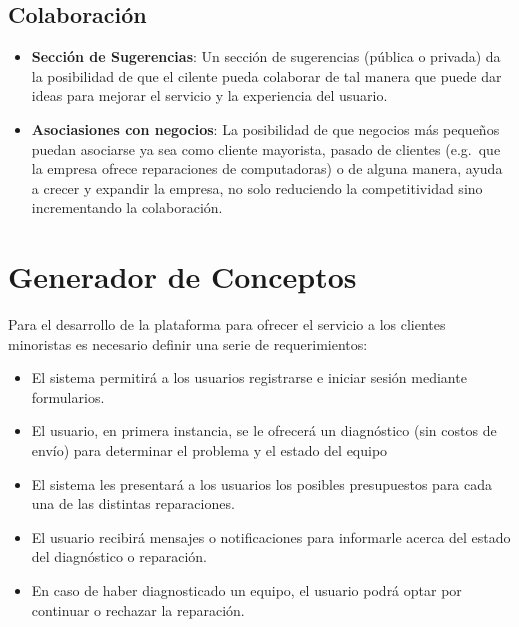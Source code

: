	\subsection{Colaboración}

	\begin{itemize}
		\item \textbf{Sección de Sugerencias}: Un sección de sugerencias (pública
			o privada) da la posibilidad de que el cilente pueda colaborar de
			tal manera que puede dar ideas para mejorar el servicio y la experiencia
			del usuario.

		\item \textbf{Asociasiones con negocios}: La posibilidad de que negocios
			más pequeños puedan asociarse ya sea como cliente mayorista,
			pasado de clientes (e.g.~que la empresa ofrece reparaciones de
			computadoras) o de alguna manera, ayuda a crecer y expandir la
			empresa, no solo reduciendo la competitividad sino incrementando
			la colaboración.
	\end{itemize}

	\section{Generador de Conceptos}

	Para el desarrollo de la plataforma para ofrecer el servicio a los
	clientes minoristas es necesario definir una serie de
	requerimientos:

	\begin{itemize}
		\item El sistema permitirá a los usuarios registrarse e iniciar sesión
			mediante formularios.

		\item El usuario, en primera instancia, se le ofrecerá un diagnóstico
			(sin costos de envío) para determinar el problema y el estado del
			equipo

		\item El sistema les presentará a los usuarios los posibles presupuestos
			para cada una de las distintas reparaciones.

		\item El usuario recibirá mensajes o notificaciones para informarle
			acerca del estado del diagnóstico o reparación.

		\item En caso de haber diagnosticado un equipo, el usuario podrá
			optar por continuar o rechazar la reparación.
	\end{itemize}

